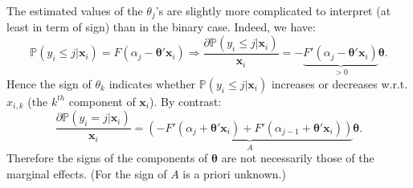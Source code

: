 \documentclass[
  12pt,
]{book}
\theoremstyle{definition}
\theoremstyle{definition}
\theoremstyle{definition}
\theoremstyle{definition}
\theoremstyle{remark}
\begin{document}
The estimated values of the \(\theta_j\)'s are slightly more complicated to interpret (at least in term of sign) than in the binary case. Indeed, we have:
\[
\mathbb{P}(y_i \le j | \mathbf{x}_i) = F(\alpha_{j} - \boldsymbol\theta'\mathbf{x}_i) \Rightarrow \frac{\partial \mathbb{P}(y_i \le j | \mathbf{x}_i)}{\mathbf{x}_i} =- \underbrace{F'(\alpha_{j} - \boldsymbol\theta'\mathbf{x}_i)}_{>0}\boldsymbol\theta.
\]
Hence the sign of \(\theta_k\) indicates whether \(\mathbb{P}(y_i \le j | \mathbf{x}_i)\) increases or decreases w.r.t. \(x_{i,k}\) (the \(k^{th}\) component of \(\mathbf{x}_i\)). By contrast:
\[
\frac{\partial \mathbb{P}(y_i = j | \mathbf{x}_i)}{\mathbf{x}_i} = \underbrace{\left(-F'(\alpha_{j} + \boldsymbol\theta'\mathbf{x}_i)+F'(\alpha_{j-1} + \boldsymbol\theta'\mathbf{x}_i)\right)}_{A}\boldsymbol\theta.
\]
Therefore the signs of the components of \(\boldsymbol\theta\) are not necessarily those of the marginal effects. (For the sign of \(A\) is a priori unknown.)
\end{document}
